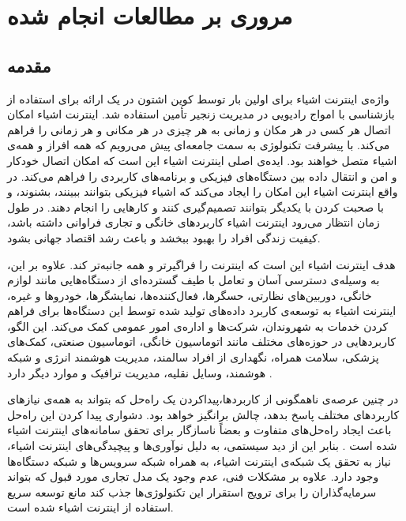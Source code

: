 \chapter{مروری بر مطالعات انجام شده}\label{chap:literature_review}
  \thispagestyle{empty}
  \section{مقدمه}
    واژه‌ی اینترنت اشیاء برای اولین بار توسط کوین اشتون در یک ارائه برای استفاده از بازشناسی با امواج رادیویی در مدیریت زنجیر تأمین استفاده شد\cite{shton2009that}.
    اینترنت اشیاء امکان اتصال هر کسی در هر مکان و زمانی به هر چیزی در هر مکانی و هر زمانی را فراهم می‌کند.
    با پیشرفت تکنولوژی به سمت جامعه‌ای پیش می‌رویم که همه افراز و همه‌ی اشیاء متصل خواهند بود\cite{zheng2011internet}.
    ایده‌ی اصلی اینترنت اشیاء این است که امکان اتصال خودکار و امن و انتقال داده‌ بین دستگاه‌های فیزیکی و برنامه‌های کاربردی را فراهم می‌کند.
    در واقع اینترنت اشیاء این امکان را ایجاد می‌کند که اشیاء فیزیکی بتوانند ببینند، بشنوند، و با صحبت کردن با یکدیگر بتوانند تصمیم‌گیری کنند و کار‌هایی را انجام دهند\cite{al2015internet}.
    در طول زمان انتظار می‌رود اینترنت اشیاء کاربرد‌های خانگی و تجاری فراوانی داشته باشد، کیفیت زندگی افراد را بهبود ببخشد و باعث رشد اقتصاد جهانی بشود.

    هدف اینترنت اشیاء این است که اینترنت را فراگیرتر و همه جانبه‌تر کند.
    علاوه بر این، به وسیله‌ی دسترسی آسان و تعامل با طیف گسترده‌ای از دستگاه‌هایی مانند لوازم خانگی، دوربین‌های نظارتی، حسگر‌ها، فعال‌کننده‌ها، نمایشگر‌ها، خودرو‌ها و غیره، اینترنت اشیاء به توسعه‌ی کاربرد داده‌های تولید شده توسط این دستگاه‌ها برای فراهم کردن خدمات به شهروندان، شرکت‌ها و اداره‌ی امور عمومی کمک می‌کند.
    این الگو، کاربرد‌هایی در حوزه‌های مختلف مانند اتوماسیون خانگی، اتوماسیون صنعتی، کمک‌های پزشکی، سلامت همراه، نگهداری از افراد سالمند، مدیریت هوشمند انرژی و شبکه هوشمند، وسایل نقلیه، مدیریت ترافیک و موارد دیگر دارد \cite{bellavista2013convergence}.

    در چنین عرصه‌ی ناهمگونی از کاربرد‌ها،پیداکردن یک راه‌حل که بتواند به همه‌ی نیاز‌های کاربرد‌های مختلف پاسخ بدهد، چالش برانگیز خواهد بود.
    دشواری پیدا کردن این راه‌حل باعث ایجاد راه‌حل‌های متفاوت و بعضاً ناسازگار برای تحقق سامانه‌های اینترنت اشیاء شده است \cite{zanella2014internet}.
    بنابر این از دید سیستمی، به دلیل نوآوری‌ها و پیچیدگی‌های اینترنت اشیاء، نیاز به تحقق یک شبکه‌ی اینترنت اشیاء، به همراه شبکه سرویس‌ها و شبکه دستگاه‌ها وجود دارد.
    علاوه بر مشکلات فنی، عدم وجود یک مدل تجاری مورد قبول که بتواند سرمایه‌گذاران را برای ترویج استقرار این تکنولوژی‌ها جذب کند مانع توسعه سریع استفاده از اینترنت اشیاء شده است\cite{laya2013investing}.

